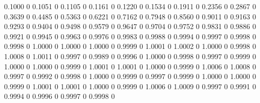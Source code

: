     0.1000         0
    0.1051         0
    0.1105         0
    0.1161         0
    0.1220         0
    0.1534         0
    0.1911         0
    0.2356         0
    0.2867         0
    0.3639         0
    0.4485         0
    0.5363         0
    0.6221         0
    0.7162         0
    0.7948         0
    0.8560         0
    0.9011         0
    0.9163         0
    0.9293         0
    0.9404         0
    0.9498         0
    0.9579         0
    0.9647         0
    0.9704         0
    0.9752         0
    0.9831         0
    0.9886         0
    0.9921         0
    0.9945         0
    0.9963         0
    0.9976         0
    0.9983         0
    0.9988         0
    0.9994         0
    0.9997         0
    0.9998         0
    0.9998         0
    1.0000         0
    1.0000         0
    1.0000         0
    0.9999         0
    1.0001         0
    1.0002         0
    1.0000         0
    0.9998         0
    1.0008         0
    1.0011         0
    0.9997         0
    0.9989         0
    0.9996         0
    1.0000         0
    0.9998         0
    0.9997         0
    0.9999         0
    1.0000         0
    1.0000         0
    0.9999         0
    1.0001         0
    1.0001         0
    1.0000         0
    0.9999         0
    1.0006         0
    1.0008         0
    0.9997         0
    0.9992         0
    0.9998         0
    1.0000         0
    0.9999         0
    0.9997         0
    0.9999         0
    1.0000         0
    1.0000         0
    0.9999         0
    1.0001         0
    1.0001         0
    1.0000         0
    0.9999         0
    1.0006         0
    1.0009         0
    0.9997         0
    0.9991         0
    0.9994         0
    0.9996         0
    0.9997         0
    0.9998         0